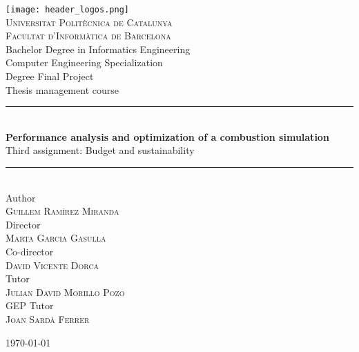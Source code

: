 \begin{titlepage}

  \newcommand{\HRule}{\rule{\linewidth}{0.5mm}}

  \begin{center}
    
    \texttt{[image: header\_logos.png]}\\[0.7cm]

    \textsc{\Large Universitat Politècnica de Catalunya}\\[0.1cm]
    \textsc{\large Facultat d'Informàtica de Barcelona}\\[0.4cm]
    {\large Bachelor Degree in Informatics Engineering}\\[0.1cm]
    {\large Computer Engineering Specialization}\\[0.1cm]
    {\large Degree Final Project}\\[0.1cm]
    {\large Thesis management course}\\[1cm]

    \HRule\\[0.4cm]

    {
      \LARGE\bfseries Performance analysis and optimization of a combustion simulation\\[0.2cm]
    }
    {\large Third assignment: Budget and sustainability}
    \\[0.4cm]\HRule\\[1cm]

    {\large Author}\\[0.1cm]
    \textsc{\large Guillem Ramírez Miranda}\\[0.4cm]
    {\large Director}\\[0.1cm]
    \textsc{\large Marta Garcia Gasulla}\\[0.4cm]
    {\large Co-director}\\[0.1cm]
    \textsc{\large David Vicente Dorca}\\[0.4cm]
    {\large Tutor}\\[0.1cm]
    \textsc{\large Julian David Morillo Pozo}\\[0.4cm]
    {\large GEP Tutor}\\[0.1cm]
    \textsc{\large Joan Sardà Ferrer}\\[0.1cm]
    \vfill
    {\large \today\par}

  \end{center}

\end{titlepage}
